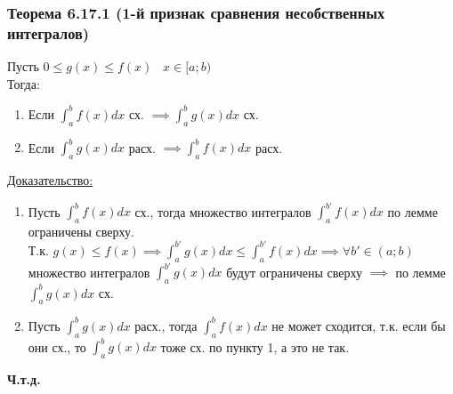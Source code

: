 \documentclass[12pt]{article}
\begin{document}
    \subsubsection*{Теорема 6.17.1 (1-й признак сравнения несобственных интегралов)}\label{th:6.17.1}\noindent
    Пусть $0\leq g(x) \leq f(x) \;\;\; x\in [a;b)$\\
    Тогда:
    \begin{enumerate}
        \item Если $\int_{a}^{b}f(x)dx$ сх. $\implies \int_{a}^{b}g(x)dx$ сх.
        \item Если $\int_{a}^{b}g(x)dx$ расх. $\implies \int_{a}^{b}f(x)dx$ расх.
    \end{enumerate}
    \underline{Доказательство:}
    \begin{adjustwidth}{1.5em}{1.5em}
        \begin{enumerate}
            \item Пусть $\int_{a}^{b}f(x)dx$ сх., тогда множество интегралов $\int_{a}^{b'}f(x)dx$ по лемме ограничены сверху.\\
            Т.к. $g(x) \leq f(x) \implies \int_{a}^{b'}g(x)dx \leq \int_{a}^{b'}f(x)dx \implies \forall b' \in (a;b)$ множество интегралов $\int_{a}^{b'}g(x)dx$ будут ограничены сверху $\implies$ по лемме $\int_{a}^{b}g(x)dx$ сх.
            \item Пусть $\int_{a}^{b}g(x)dx$ расх., тогда $\int_{a}^{b}f(x)dx$ не может сходится, т.к. если бы они сх., то $\int_{a}^{b}g(x)dx$ тоже сх. по пункту 1, а это не так.
        \end{enumerate}
        \begin{center}
            \textbf{Ч.т.д.}
        \end{center}
    \end{adjustwidth}
\end{document}
